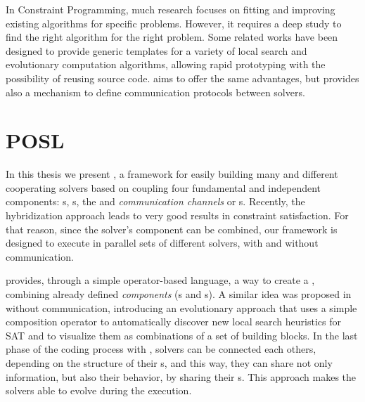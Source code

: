 In Constraint Programming, much research focuses on fitting and improving existing algorithms for specific problems. However, it requires a deep study to find the right algorithm for the right problem. Some related works have been designed to provide generic templates for a variety of local search and evolutionary computation algorithms, allowing rapid prototyping with the possibility of reusing source code. \af{} aims to offer the same advantages, but provides also a mechanism to define communication protocols between solvers.

\section{POSL}
In this thesis we present \af{}, a framework for easily building many and different cooperating solvers based on coupling four fundamental and independent components: \module s, \opch s, the \cstr{} and {\it communication channels} or \sus s. Recently, the hybridization approach leads to very good results in constraint satisfaction. For that reason, since the solver's component can be combined, our framework is designed to execute in parallel sets of different solvers, with and without communication.

\af{} provides, through a simple operator-based language, a way to create a \cstr, combining already defined {\it components} (\module s and \opch s). A similar idea was proposed in \cite{Fukunaga2008} without communication, introducing an evolutionary approach that uses a simple composition operator to automatically discover new local search heuristics for SAT and to  visualize them as combinations of a set of building blocks. 
In the last phase of the coding process with \af{}, solvers can be connected each others, depending on the structure of their \opch s, and this way, they can share not only information, but also their behavior, by sharing their \module s. This approach makes the solvers able to evolve during the execution.

